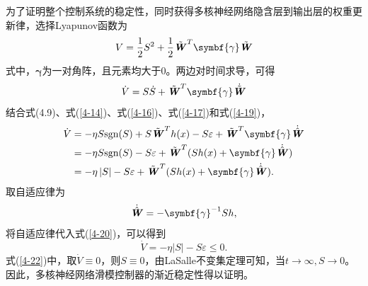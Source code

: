 为了证明整个控制系统的稳定性，同时获得多核神经网络隐含层到输出层的权重更新律，选择Lyapunov函数为
\begin{equation}
\label{4-18}
V=\frac{1}{2}{{S}^{2}}+\frac{1}{2}{{\tilde{\textbf{\textit{W}}}}^{T}}\symbf{\gamma}\tilde{\textbf{\textit{W}}}
\end{equation}
式中，$\symbf{\gamma}$为一对角阵，且元素均大于0。两边对时间求导，可得
\begin{equation}
\label{4-19}
\dot{V}=S \dot{S}+\tilde{\textbf{\textit{W}}}^{T}\symbf{\gamma} \dot{\tilde{\textbf{\textit{W}}}}
\end{equation}
结合式(4.9)、式(\ref{4-14})、式(\ref{4-16})、式(\ref{4-17})和式(\ref{4-19})，
\begin{equation}
\label{4-20}
\begin{aligned}
\dot{V}&=-\eta S\text{sgn}(S)+S{{{\tilde{\textbf{\textit{W}}}}}^{T}}h(x)-S\varepsilon +{{{\tilde{\textbf{\textit{W}}}}}^{T}}\symbf{\gamma}\dot{\hat{\textbf{\textit{W}}}} \\ 
&=-\eta S\text{sgn}(S)-S\varepsilon +{{{\tilde{\textbf{\textit{W}}}}}^{T}}(Sh(x)+\symbf{\gamma}\dot{\hat{\textbf{\textit{W}}}}) \\ 
&=-\eta \left| S \right|-S\varepsilon +{{{\tilde{\textbf{\textit{W}}}}}^{T}}(Sh(x)+\symbf{\gamma}\dot{\hat{\textbf{\textit{W}}}})\text{.} \\ 
\end{aligned}
\end{equation}
取自适应律为 
\begin{equation}
\label{4-21}
\dot{\hat{\textbf{\textit{W}}}}=-\symbf{\gamma}^{-1}Sh\text{,}
\end{equation}
将自适应律代入式(\ref{4-20})，可以得到
\begin{equation}
\label{4-22}
\dot{V}=-\eta\left|S\right|-S\varepsilon\le 0\text{.}
\end{equation}
式(\ref{4-22})中，取$\dot{V}\equiv0$，则$S\equiv0$，由LaSalle不变集定理可知，当$t\to\infty,S\to0$。因此，多核神经网络滑模控制器的渐近稳定性得以证明。

